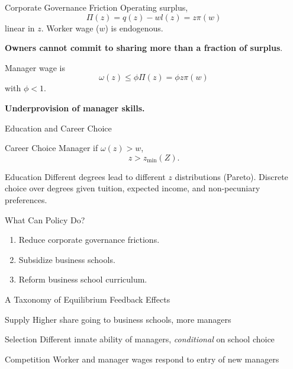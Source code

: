 \documentclass[
  ignorenonframetext,
  aspectratio=1610,
]{beamer}
\providecommand{\tightlist}{%
  \setlength{\itemsep}{0pt}\setlength{\parskip}{0pt}}
\begin{document}
\begin{frame}{Corporate Governance Friction}
\protect\hypertarget{corporate-governance-friction}{}
Operating surplus, \[\Pi(z) = q(z) - w l(z) = z \pi(w) \] linear in
\(z\). Worker wage (\(w\)) is endogenous. \pause

\textbf{Owners cannot commit to sharing more than a fraction of
surplus}.

Manager wage is \[
\omega(z) \le \phi \Pi(z) = \phi z \pi(w) 
\] with \(\phi < 1\).

\textbf{Underprovision of manager skills.}
\end{frame}

\begin{frame}{Education and Career Choice}
\protect\hypertarget{education-and-career-choice}{}
\begin{block}{Career Choice}
\protect\hypertarget{career-choice}{}
Manager if \(\omega(z) > w\), \[ z > z_{\min}(Z).\]
\end{block}

\begin{block}{Education}
\protect\hypertarget{education}{}
Different degrees lead to different \(z\) distributions (Pareto).
Discrete choice over degrees given tuition, expected income, and
non-pecuniary preferences.
\end{block}
\end{frame}

\begin{frame}{What Can Policy Do?}
\protect\hypertarget{what-can-policy-do}{}
\begin{enumerate}
\tightlist
\item
  Reduce corporate governance frictions.
\item
  Subsidize business schools.
\item
  Reform business school curriculum.
\end{enumerate}
\end{frame}

\begin{frame}{A Taxonomy of Equilibrium Feedback Effects}
\protect\hypertarget{a-taxonomy-of-equilibrium-feedback-effects}{}
\begin{block}{Supply}
\protect\hypertarget{supply}{}
Higher share going to business schools, more managers
\end{block}

\begin{block}{Selection}
\protect\hypertarget{selection}{}
Different innate ability of managers, \emph{conditional} on school
choice
\end{block}

\begin{block}{Competition}
\protect\hypertarget{competition}{}
Worker and manager wages respond to entry of new managers
\end{block}
\end{frame}
\end{document}
